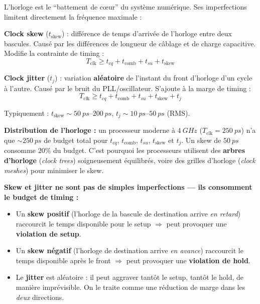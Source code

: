 \documentclass[12pt,a4paper,twoside]{book}
\begin{document}
\begin{formule}
L'horloge est le ``battement de cœur'' du système numérique. Ses imperfections limitent directement la fréquence maximale :

\textbf{Clock skew} ($t_{\text{skew}}$) : différence de temps d'arrivée de l'horloge entre deux bascules. Causé par les différences de longueur de câblage et de charge capacitive. Modifie la contrainte de timing :
\[
T_{\text{clk}} \geq t_{cq} + t_{\text{comb}} + t_{su} + t_{\text{skew}}
\]

\textbf{Clock jitter} ($t_j$) : variation \textbf{aléatoire} de l'instant du front d'horloge d'un cycle à l'autre. Causé par le bruit du PLL/oscillateur. S'ajoute à la marge de timing :
\[
T_{\text{clk}} \geq t_{cq} + t_{\text{comb}} + t_{su} + t_{\text{skew}} + t_j
\]

Typiquement : $t_{\text{skew}} \sim \SI{50}{ps}$--$\SI{200}{ps}$, $t_j \sim \SI{10}{ps}$--$\SI{50}{ps}$ (RMS).
\end{formule}

\begin{intuition}
\textbf{Distribution de l'horloge :} un processeur moderne à $\SI{4}{GHz}$ ($T_{\text{clk}} = \SI{250}{ps}$) n'a que $\sim\SI{250}{ps}$ de budget total pour $t_{cq}$, $t_{\text{comb}}$, $t_{su}$, $t_{\text{skew}}$ et $t_j$. Un skew de $\SI{50}{ps}$ consomme $20\%$ du budget. C'est pourquoi les processeurs utilisent des \textbf{arbres d'horloge} (\textit{clock trees}) soigneusement équilibrés, voire des grilles d'horloge (\textit{clock meshes}) pour minimiser le skew.
\end{intuition}

\begin{formule}
\textbf{Skew et jitter ne sont pas de simples imperfections --- ils consomment le budget de timing :}
\begin{itemize}[nosep]
\item Un \textbf{skew positif} (l'horloge de la bascule de destination arrive \textit{en retard}) raccourcit le temps disponible pour le setup $\Rightarrow$ peut provoquer une \textbf{violation de setup}.
\item Un \textbf{skew négatif} (l'horloge de destination arrive \textit{en avance}) raccourcit le temps disponible après le front $\Rightarrow$ peut provoquer une \textbf{violation de hold}.
\item Le \textbf{jitter} est aléatoire : il peut aggraver tantôt le setup, tantôt le hold, de manière imprévisible. On le traite comme une réduction de marge dans les \textit{deux} directions.
\end{itemize}
\end{formule}
\end{document}
